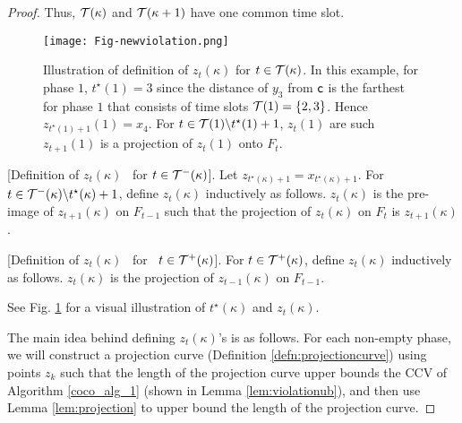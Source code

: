\begin{proof}
Thus, $\mathcal{T}(\kappa)$ and $\mathcal{T}(\kappa+1)$ have one common time slot.

\begin{figure}
\texttt{[image: Fig-newviolation.png]}
\caption{Illustration of definition of $z_t(\kappa)$ for $t\in \mathcal{T}(\kappa)$. In this example, for phase $1$, $t^\star(1)=3$ since the distance of $y_3$ from ${\mathsf{c}}$ is the farthest for phase $1$ that consists of time slots 
$\mathcal{T}(1) = \{2,3\}$. Hence $z_{t^\star(1)+1}(1)=x_4$. For $t \in \mathcal{T}(1) \backslash  t^\star(1)+1$,  $z_{t}(1)$ are such 
$z_{t+1}(1)$ is a projection of $z_{t}(1)$ onto $F_t$.}
\label{fig:MaxR}
\end{figure}
\begin{definition}\label{}
[Definition of $z_t(\kappa)$ \  for $t\in \mathcal{T}^-(\kappa)$]. Let 
$z_{t^\star(\kappa)+1} = x_{t^\star(\kappa)+1}$.
For $t \in \mathcal{T}^-(\kappa) \backslash t^\star(\kappa)+1$, define $z_t(\kappa)$ inductively as follows. 
$z_t(\kappa)$ is the pre-image of $z_{t+1}(\kappa)$ on $F_{t-1}$ such that the projection of $z_t(\kappa)$ on $F_t$ 
is $z_{t+1}(\kappa)$. 
\end{definition}

\begin{definition}\label{}
[Definition of $z_t(\kappa)$ \  for \ $t\in \mathcal{T}^+(\kappa)$]. 
For $t\in \mathcal{T}^+(\kappa)$, define $z_t(\kappa)$ inductively as follows. 
$z_t(\kappa)$ is the projection of $z_{t-1}(\kappa)$ on $F_{t-1}$. 
\end{definition}

See Fig. \ref{fig:MaxR} for a visual illustration of $t^\star(\kappa)$ and $z_t(\kappa)$.

The main idea behind defining $z_t(\kappa)$'s  is as follows. For each non-empty phase, we will construct a projection curve (Definition \ref{defn:projectioncurve}) using points $z_k$ such that the length of the projection curve upper bounds the CCV of Algorithm \ref{coco_alg_1} (shown in Lemma \ref{lem:violationub}), and then use Lemma \ref{lem:projection} to upper bound the length of the projection curve. %


\end{proof}
